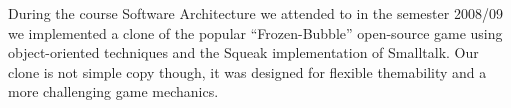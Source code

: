 During the course Software Architecture we 
attended to in the semester 2008/09 we 
implemented a clone of the popular ``Frozen-Bubble''
open-source game using object-oriented techniques 
and the Squeak implementation of Smalltalk.
Our clone is not simple copy though, it was 
designed for flexible themability and
a more challenging game mechanics.